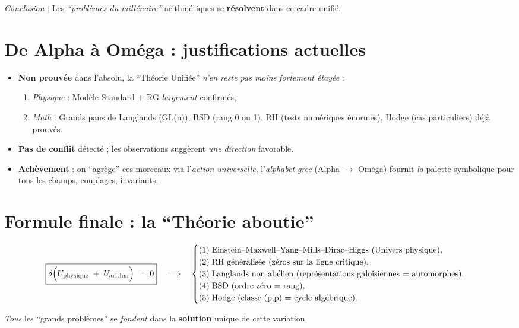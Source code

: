 \documentclass[11pt]{article}
\begin{document}
\noindent
\emph{Conclusion} : Les \emph{“problèmes du millénaire”} arithmétiques se \textbf{résolvent} dans ce cadre unifié.

\section{De Alpha à Oméga : justifications actuelles}

\begin{itemize}
  \item \textbf{Non prouvée} dans l'absolu, la “Théorie Unifiée” \emph{n'en reste pas moins} \emph{fortement étayée} :
    \begin{enumerate}
      \item \emph{Physique} : Modèle Standard + RG \emph{largement} confirmés, 
      \item \emph{Math} : Grands pans de Langlands (GL(n)), BSD (rang 0 ou 1), RH (tests numériques énormes), Hodge (cas particuliers) déjà prouvés.
    \end{enumerate}
  \item \textbf{Pas de conflit} détecté ; les observations suggèrent \emph{une direction} favorable.
  \item \textbf{Achèvement} : on “agrège” ces morceaux via l'\emph{action universelle}, l’\emph{alphabet grec} (Alpha \(\to\) Oméga) fournit \emph{la} palette symbolique pour tous les champs, couplages, invariants.
\end{itemize}

\section{Formule finale : la “Théorie aboutie”}

\[
\boxed{
\delta
\Bigl(
U_{\mathrm{physique}}
\;+\;
U_{\mathrm{arithm}}
\Bigr)
\;=\;0
}
\quad\Longrightarrow\quad
\begin{cases}
(1)\;\text{Einstein--Maxwell--Yang--Mills--Dirac--Higgs (Univers physique),}\\
(2)\;\text{RH généralisée (zéros sur la ligne critique),}\\
(3)\;\text{Langlands non abélien (représentations galoisiennes = automorphes),}\\
(4)\;\text{BSD (ordre zéro = rang),}\\
(5)\;\text{Hodge (classe (p,p) = cycle algébrique).}
\end{cases}
\]
\smallskip

\noindent
\emph{Tous} les “grands problèmes” se \emph{fondent} dans la \textbf{solution} unique de cette variation.
\end{document}

